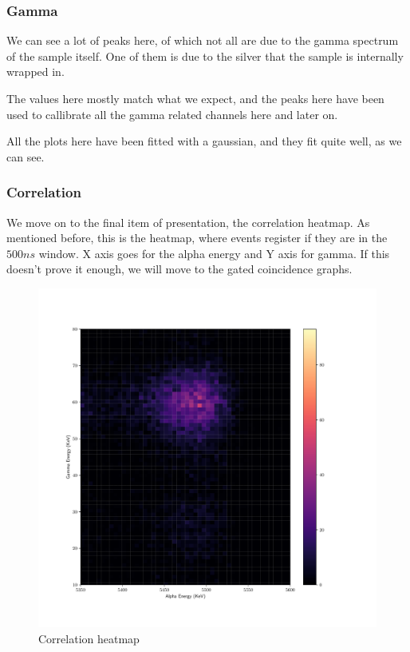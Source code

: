 \documentclass{double}
\begin{document}
\begin{multicols*}{2}
\subsubsection{Gamma}
We can see a lot of peaks here, of which not all are due to
the gamma spectrum of the sample itself. One of them is due
to the silver that the sample is internally wrapped in.

The values here mostly match what we expect, and the peaks
here have been used to callibrate all the gamma related
channels here and later on.
\begin{figure}[H]
	\centering
	\resizebox{0.8\columnwidth}{!}{%
		
	}
\end{figure}
\noindent All the plots here have been fitted with a
gaussian, and they fit quite well, as we can see.

\subsubsection{Correlation}
We move on to the final item of presentation, the
correlation heatmap. As mentioned before, this is the
heatmap, where events register if they are in the $500ns$
window. X axis goes for the alpha energy and Y axis for
gamma. If this doesn't prove it enough, we will move to the
gated coincidence graphs.
\begin{figure}[H]
	\centering
    \includegraphics[width=\columnwidth]{images/hmap.pdf}
    \caption{Correlation heatmap}
\end{figure}


\end{multicols*}
\end{document}
